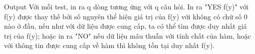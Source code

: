 Output  
Với mỗi test, in ra q dòng tương ứng với q câu hỏi. In ra "YES f(y)" với f(y) được thay thế bởi số nguyên thể hiện giá trị của f(y) với không có chữ số 0 nào ở đầu, nếu như với dữ liệu được cung cấp, ta có thể tìm được duy nhất giá trị của f(y); hoặc in ra "NO" nếu dữ liệu mâu thuẫn với tính chất của hàm, hoặc với thông tin được cung cấp về hàm thì không tồn tại duy nhất f(y).